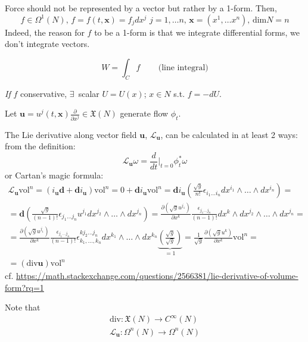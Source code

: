 \documentclass[10pt]{amsart}
\begin{document}
\begin{multicols*}{2}
Force should not be represented by a vector but rather by a 1-form. Then, 
\[
f \in \Omega^1(N), \, f=f(t, \mathbf{x}) = f_j dx^j \, \, j=1, \dots n , \, \mathbf{x} = (x^1, \dots x^n), \, \text{dim}N = n
\]
Indeed, the reason for $f$ to be a 1-form is that we integrate differential forms, we don't integrate vectors. 

\begin{equation}
W = \int_C f \qquad \, \text{(line integral)}
\end{equation}

\emph{If} $f$ conservative, $\exists\, $ scalar $U = U(x)$; $x\in N$ s.t. $f=-dU$.

Let $\mathbf{u} = u^j(t,\mathbf{x}) \frac{\partial}{ \partial x^j} \in \mathfrak{X}(N)$ generate flow $\phi_t$.

The Lie derivative along vector field $\mathbf{u}$, $\mathcal{L}_{\mathbf{u}}$, can be calculated in at least 2 ways: from the definition:
\[
\mathcal{L}_{\mathbf{u}} \omega  =\frac{d}{dt} \left. \right|_{t = 0} \phi_t^*\omega
\]
or Cartan's magic formula:
\begin{equation}
\begin{gathered}
	\mathcal{L}_{\mathbf{u}} \text{vol}^n = (i_{\mathbf{u}}\mathbf{d} + \mathbf{d}i_{\mathbf{u}}) \text{vol}^n = 0 + \mathbf{d}i_{\mathbf{u}} \text{vol}^n = \mathbf{d}i_{\mathbf{u}} \left( \frac{ \sqrt{g}}{n!} \epsilon_{i_1 \dots i_n} dx^{i_1} \wedge \dots \wedge dx^{i_n} \right) = \\ 
	= \mathbf{d} \left( \frac{\sqrt{g}}{(n-1)! } \epsilon_{j_1 \dots j_n} u^{j_1} dx^{j_2} \wedge \dots \wedge dx^{j_n} \right) = \frac{ \partial (\sqrt{g} u^{j_1} )}{ \partial x^k} \frac{ \epsilon_{j_1 \dots j_n}}{(n-1)!} dx^k \wedge dx^{j_2} \wedge \dots \wedge dx^{j_n} = \\
	= \frac{ \partial (\sqrt{g} u^{j_1}) }{ \partial x^k} \frac{ \epsilon_{j_1 \dots j_n} }{ (n-1)! } \epsilon^{k j_2 \dots j_n}_{ k_1, \dots, k_n} dx^{k_1} \wedge \dots \wedge dx^{k_n} \underbrace{\left( \frac{ \sqrt{g}}{ \sqrt{g}} \right)}_{=1} = \frac{1}{\sqrt{g}} \frac{ \partial ( \sqrt{g} u^k) }{ \partial x^k} \text{vol}^n =  \\
	= (\text{div}{\mathbf{u}}) \text{vol}^n
\end{gathered}
\end{equation}
cf. \url{https://math.stackexchange.com/questions/2566381/lie-derivative-of-volume-form?rq=1}

Note that
\[
\begin{gathered}
	\text{div}: \mathfrak{X}(N) \to C^{\infty}(N) \\ 
 \mathcal{L}_{\mathbf{u}}: \Omega^n(N) \to \Omega^n(N) 
\end{gathered}
\]


\end{multicols*}
\end{document}
